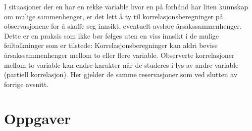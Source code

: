I situasjoner der en har en rekke variable hvor en på forhånd 
har liten kunnskap om mulige sammenhenger, er det lett å ty til 
korrelasjonsberegninger på observasjonene for å skaffe seg innsikt,
eventuelt avsløre årsaks\-sammenhenger.  Dette er en praksis som 
ikke bør følges uten en viss innsikt i de mulige feiltolkninger
som er tilstede:  Korrelasjonsberegninger kan aldri bevise 
årsakssammenhenger mellom to eller flere variable.  Observerte 
kor\-rela\-sjoner mellom to variable kan endre karakter når de studeres
i lys av andre variable (partiell korrelasjon).  Her gjelder de samme
reservasjoner som ved slutten av forrige avsnitt.


\section{Oppgaver}
\small
